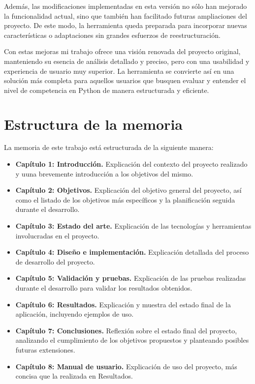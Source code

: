 \documentclass[a4paper, 12pt]{book}
\begin{document}
Además, las modificaciones implementadas en esta versión no sólo han mejorado la funcionalidad actual, sino que también han facilitado futuras ampliaciones del proyecto. De este modo, la herramienta queda preparada para incorporar nuevas características o adaptaciones sin grandes esfuerzos de reestructuración.

Con estas mejoras mi trabajo ofrece una visión renovada del proyecto original, manteniendo su esencia de análisis detallado y preciso, pero con una usabilidad y experiencia de usuario muy superior. La herramienta se convierte así en una solución más completa para aquellos usuarios que busquen evaluar y entender el nivel de competencia en Python de manera estructurada y eficiente.

\section{Estructura de la memoria}
\label{sec:estructura}


La memoria de este trabajo está estructurada de la siguiente manera:

\begin{itemize}
    \item \textbf{Capítulo 1: Introducción.} Explicación del contexto del proyecto realizado y uuna brevemente introducción a los objetivos del mismo.
    \item \textbf{Capítulo 2: Objetivos.} Explicación del objetivo general del proyecto, así como el listado de los objetivos más específicos y la planificación seguida durante el desarrollo.
    \item \textbf{Capítulo 3: Estado del arte.} Explicación de las tecnologías y herramientas involucradas en el proyecto.
    \item \textbf{Capítulo 4: Diseño e implementación.} Explicación detallada del proceso de desarrollo del proyecto.
    \item \textbf{Capítulo 5: Validación y pruebas.} Explicación de las pruebas realizadas durante el desarrollo para validar los resultados obtenidos.
    \item \textbf{Capítulo 6: Resultados.} Explicación y muestra del estado final de la aplicación, incluyendo ejemplos de uso.
    \item \textbf{Capítulo 7: Conclusiones.} Reflexión sobre el estado final del proyecto, analizando el cumplimiento de los objetivos propuestos y planteando posibles futuras extensiones.
    \item \textbf{Capítulo 8: Manual de usuario.} Explicación de uso del proyecto, más concisa que la realizada en Resultados.
    
\end{itemize}
\end{document}
